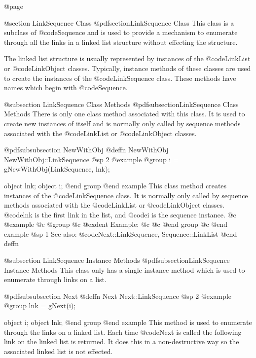 @page

@section LinkSequence Class
@pdfsection{LinkSequence Class}
This class is a subclass of @code{Sequence} and is used to provide a
mechanism to enumerate through all the links in a linked list structure
without effecting the structure.

The linked list structure is usually represented by instances of the
@code{LinkList} or @code{LinkObject} classes.  Typically, instance
methods of these classes are used to create the instances of the
@code{LinkSequence} class.  These methods have names which begin with
@code{Sequence}.



@subsection LinkSequence Class Methods
@pdfsubsection{LinkSequence Class Methods}
There is only one class method associated with this class.  It is used
to create new instances of itself and is normally only called by
sequence methods associated with the @code{LinkList} or @code{LinkObject}
classes.





@pdfsubsubsection {NewWithObj}
@deffn {NewWithObj} NewWithObj::LinkSequence
@sp 2
@example
@group
i = gNewWithObj(LinkSequence, lnk);

object  lnk;
object  i;
@end group
@end example
This class method creates instances of the @code{LinkSequence} class.
It is normally only called by sequence methods associated with the
@code{LinkList} or @code{LinkObject} classes.  @code{lnk} is the first
link in the list, and @code{i} is the sequence instance.
@c @example
@c @group
@c @exdent Example:
@c 
@c @end group
@c @end example
@sp 1
See also:  @code{Next::LinkSequence, Sequence::LinkList}
@end deffn




@subsection LinkSequence Instance Methods
@pdfsubsection{LinkSequence Instance Methods}
This class only has a single instance method which is used to enumerate
through links on a list.






@pdfsubsubsection {Next}
@deffn {Next} Next::LinkSequence
@sp 2
@example
@group
lnk = gNext(i);

object  i;
object  lnk;
@end group
@end example
This method is used to enumerate through the links on a linked list.
Each time @code{Next} is called the following link on the linked list
is returned.  It does this in a non-destructive way so the associated
linked list is not effected.

